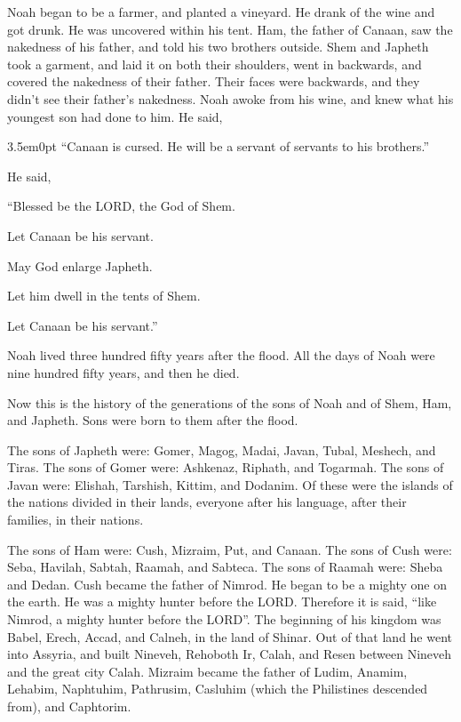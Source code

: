 \myverse{}Noah began to be a farmer, and planted a vineyard. \myverse{}He drank of the wine and got drunk. He was uncovered within his tent. \myverse{}Ham, the father of Canaan, saw the nakedness of his father, and told his two brothers outside. \myverse{}Shem and Japheth took a garment, and laid it on both their shoulders, went in backwards, and covered the nakedness of their father. Their faces were backwards, and they didn’t see their father’s nakedness. \myverse{}Noah awoke from his wine, and knew what his youngest son had done to him. \myverse{}He said,
\begin{adjustwidth}{3.5em}{0pt}
	“Canaan is cursed.
	He will be a servant of servants to his brothers.”
	
	\myverse{}He said,
	
	“Blessed be the LORD, the God of Shem.
	
	Let Canaan be his servant.
	
	\myverse{}May God enlarge Japheth.
	
	Let him dwell in the tents of Shem.
	
	Let Canaan be his servant.”
\end{adjustwidth}

\myverse{}Noah lived three hundred fifty years after the flood. \myverse{}All the days of Noah were nine hundred fifty years, and then he died.


\mychapter{}
\myverse*{}Now this is the history of the generations of the sons of Noah and of Shem, Ham, and Japheth. Sons were born to them after the flood.

\myverse{}The sons of Japheth were: Gomer, Magog, Madai, Javan, Tubal, Meshech, and Tiras. \myverse{}The sons of Gomer were: Ashkenaz, Riphath, and Togarmah. \myverse{}The sons of Javan were: Elishah, Tarshish, Kittim, and Dodanim. \myverse{}Of these were the islands of the nations divided in their lands, everyone after his language, after their families, in their nations.

\myverse{}The sons of Ham were: Cush, Mizraim, Put, and Canaan. \myverse{}The sons of Cush were: Seba, Havilah, Sabtah, Raamah, and Sabteca. The sons of Raamah were: Sheba and Dedan. \myverse{}Cush became the father of Nimrod. He began to be a mighty one on the earth. \myverse{}He was a mighty hunter before the LORD. Therefore it is said, “like Nimrod, a mighty hunter before the LORD”. \myverse{}The beginning of his kingdom was Babel, Erech, Accad, and Calneh, in the land of Shinar. \myverse{}Out of that land he went into Assyria, and built Nineveh, Rehoboth Ir, Calah, \myverse{}and Resen between Nineveh and the great city Calah. \myverse{}Mizraim became the father of Ludim, Anamim, Lehabim, Naphtuhim, \myverse{}Pathrusim, Casluhim (which the Philistines descended from), and Caphtorim.

